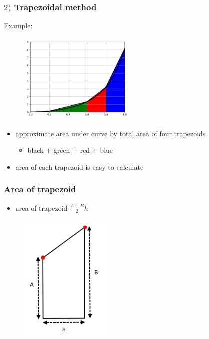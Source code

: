 \documentclass[english,14pt]{beamer}
\newcommand\red[1]{{\color{red} #1}}
\newcommand\blue[1]{{\color{blue} #1}}
\newcommand\darkGreen[1]{{\color{darkGreen} #1}}
\begin{document}
\begin{frame}[fragile]

\frametitle{$2)$ Trapezoidal method}

Example:
\vspace*{-5mm}
\begin{figure}[ht]
	\centering
	\includegraphics[width=0.5\textwidth]{figures/fourPanel}
\end{figure}
\vspace*{-3mm}
\begin{itemize}
	\item approximate area under curve by total area of four trapezoids
	\begin{itemize}
		\item black + \darkGreen{green} + \red{red} + \blue{blue}
	\end{itemize}
	\item area of each trapezoid is easy to calculate %
\end{itemize}



\end{frame}


\begin{frame}[fragile]

\frametitle{Area of trapezoid}

\begin{itemize}
	\item area of trapezoid $\frac{A+B}{2} h$
\end{itemize}
\vspace*{-3mm}
\begin{figure}[ht]
	\centering
	\includegraphics[width=0.4\textwidth]{figures/trapezoidArea}
\end{figure}

\end{frame}
\end{document}
